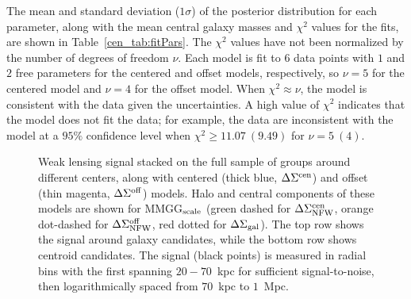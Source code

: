 The mean and standard deviation ($1\sigma$) of the
  posterior distribution for each parameter, along with the mean
central galaxy masses and $\chi^2$ values for the fits, are shown in
Table~\ref{cen_tab:fitPars}. The $\chi^2$ values have not
  been normalized by the number of degrees of freedom $\nu$. Each
  model is fit to $6$ data points with $1$ and $2$ free parameters for
  the centered and offset models, respectively, so $\nu=5$ for the
  centered model and $\nu=4$ for the offset model. When $\chi^2
  \approx \nu$, the model is consistent with the data given the
  uncertainties. A high value of $\chi^2$ indicates that the model
  does not fit the data; for example, the data are inconsistent with
  the model at a $95\%$ confidence level when $\chi^2 \geq
  11.07~(9.49)$ for $\nu= 5~(4)$.

\begin{figure*}[htb]
\caption{Weak lensing signal stacked on the full sample of groups
  around different centers, along with centered (thick blue,
  $\Delta\Sigma^{\rm cen}$) and offset (thin magenta,
  $\Delta\Sigma^{\rm off}$) models. Halo and central components of
  these models are shown for MMGG$_{\rm scale}$ (green dashed for
  $\Delta\Sigma^{\rm cen}_{\rm NFW}$, orange dot-dashed for
  $\Delta\Sigma^{\rm off}_{\rm NFW}$, red dotted for
  $\Delta\Sigma_{\rm gal}$). The top row shows the signal around
  galaxy candidates, while the bottom row shows centroid
  candidates. The signal (black points) is measured in radial bins
  with the first spanning $20-70$~{\rm kpc} for sufficient
  signal-to-noise, then logarithmically spaced from $70$~{\rm kpc} to
  $1$~{\rm Mpc}.}
\label{cen_fig:full_stacks}
\end{figure*}

